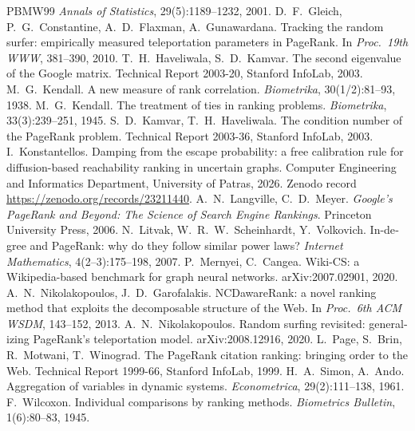 \documentclass[11pt,a4paper]{article}
\theoremstyle{definition}
\theoremstyle{remark}
\begin{document}
\begin{otherlanguage}{english}
\begin{thebibliography}{PBMW99}
\emph{Annals of Statistics}, 29(5):1189--1232, 2001.
 D.~F.~Gleich, P.~G.~Constantine, A.~D.~Flaxman, A.~Gunawardana. Tracking the random
surfer: empirically measured teleportation parameters in PageRank. In \emph{Proc.\ 19th WWW}, 381--390,
2010.
 T.~H.~Haveliwala, S.~D.~Kamvar. The second eigenvalue of the Google matrix.
Technical Report 2003-20, Stanford InfoLab, 2003.
 M.~G.~Kendall. A new measure of rank correlation. \emph{Biometrika}, 30(1/2):81--93,
1938.
 M.~G.~Kendall. The treatment of ties in ranking problems. \emph{Biometrika},
33(3):239--251, 1945.
 S.~D.~Kamvar, T.~H.~Haveliwala. The condition number of the PageRank problem.
Technical Report 2003-36, Stanford InfoLab, 2003.
 I.~Konstantellos. Damping from the escape probability: a free calibration
rule for diffusion-based reachability ranking in uncertain graphs. Computer Engineering and Informatics
Department, University of Patras, 2026. Zenodo record \url{https://zenodo.org/records/23211440}.
 A.~N.~Langville, C.~D.~Meyer. \emph{Google's PageRank and Beyond: The Science of
Search Engine Rankings}. Princeton University Press, 2006.
 N.~Litvak, W.~R.~W.~Scheinhardt, Y.~Volkovich. In-degree and PageRank: why do they
follow similar power laws? \emph{Internet Mathematics}, 4(2--3):175--198, 2007.
 P.~Mernyei, C.~Cangea. Wiki-CS: a Wikipedia-based benchmark for graph neural
networks. arXiv:2007.02901, 2020.
 A.~N.~Nikolakopoulos, J.~D.~Garofalakis. NCDawareRank: a novel ranking method that
exploits the decomposable structure of the Web. In \emph{Proc.\ 6th ACM WSDM}, 143--152, 2013.
 A.~N.~Nikolakopoulos. Random surfing revisited: generalizing PageRank's teleportation
model. arXiv:2008.12916, 2020.
 L.~Page, S.~Brin, R.~Motwani, T.~Winograd. The PageRank citation ranking: bringing order
to the Web. Technical Report 1999-66, Stanford InfoLab, 1999.
 H.~A.~Simon, A.~Ando. Aggregation of variables in dynamic systems. \emph{Econometrica},
29(2):111--138, 1961.
 F.~Wilcoxon. Individual comparisons by ranking methods. \emph{Biometrics Bulletin},
1(6):80--83, 1945.
\end{thebibliography}
\end{otherlanguage}

\FloatBarrier
\appendix
\end{document}
